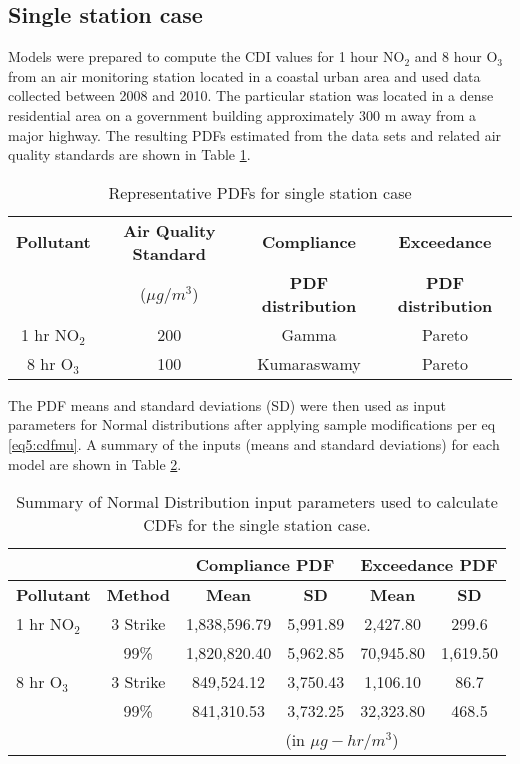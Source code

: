\subsection{Single station case}
Models were prepared to compute the CDI values for 1 hour NO$_{2}$ and 8 hour O$_{3}$ from an air monitoring station located in a coastal urban area and used data collected between 2008 and 2010.  The particular station was located in a dense residential area on a government building approximately 300 m away from a major highway. The resulting PDFs estimated from the data sets and related air quality standards are shown in Table \ref{tb5:singlePDF}.
%
\begin{table}[H]
\centering
\caption{Representative PDFs for single station case}
\label{tb5:singlePDF}
\begin{tabular}{@{}cccc@{}}
\toprule
\textbf{Pollutant} & \textbf{Air Quality Standard}  & \textbf{Compliance} & \textbf{Exceedance} \\ 
 &($\mu g/m^{3}$) &\textbf{PDF distribution} & \textbf{PDF distribution} \\ \midrule
1 hr NO$_{2}$ & 200 & Gamma & Pareto \\
8 hr O$_{3}$ & 100 & Kumaraswamy & Pareto \\ \bottomrule
\end{tabular}
\end{table}
%
The PDF means and standard deviations (SD) were then used as input parameters for Normal distributions after applying sample modifications per eq \ref{eq5:cdfmu}.  A summary of the inputs (means and standard deviations) for each model are shown in Table \ref{tb6:singleInputs}.
%
\begin{table}[H]
\centering
\caption{Summary of Normal Distribution input parameters used to calculate CDFs for the single station case.} 
\label{tb6:singleInputs}
\begin{tabular}{@{}lccccc@{}}
\toprule
\textbf{} & \textbf{} & \multicolumn{2}{c}{\textbf{Compliance PDF}} & \multicolumn{2}{c}{\textbf{Exceedance PDF}} \\ \midrule
\textbf{Pollutant} & \textbf{Method} & \textbf{Mean} & \textbf{SD} & \textbf{Mean} & \textbf{SD} \\
1 hr NO$_{2}$ & 3 Strike & 1,838,596.79 & 5,991.89 & 2,427.80 & 299.6 \\
 & 99\% & 1,820,820.40 & 5,962.85 & 70,945.80 & 1,619.50 \\
8 hr O$_{3}$ & 3 Strike & 849,524.12 & 3,750.43 & 1,106.10 & 86.7 \\
 & 99\% & 841,310.53 & 3,732.25 & 32,323.80 & 468.5 \\ \bottomrule
 &  & \multicolumn{4}{c}{(in $\mu g-hr/m^{3}$)} \\ 
\end{tabular}
\end{table}

